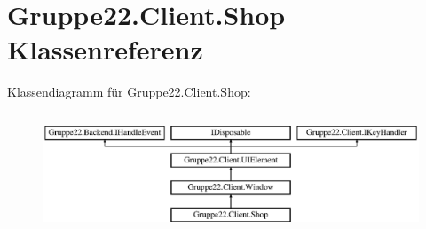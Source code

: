 \hypertarget{class_gruppe22_1_1_client_1_1_shop}{\section{Gruppe22.\-Client.\-Shop Klassenreferenz}
\label{class_gruppe22_1_1_client_1_1_shop}
}
Klassendiagramm für Gruppe22.\-Client.\-Shop\-:\begin{figure}[H]
\begin{center}
\leavevmode
\includegraphics[height=3.589744cm]{class_gruppe22_1_1_client_1_1_shop}
\end{center}
\end{figure}
